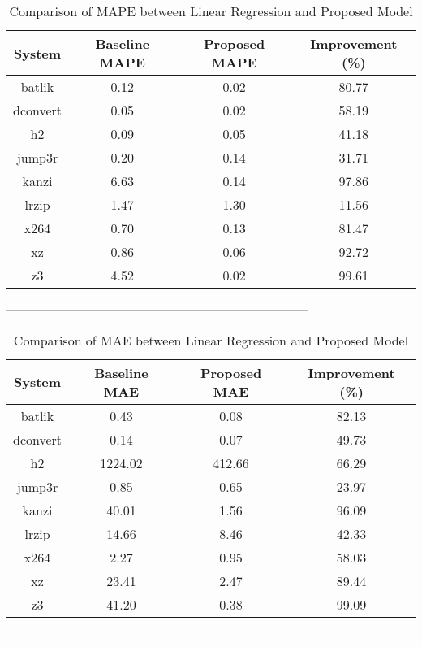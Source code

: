 \begin{table}[h]
    \centering
    \begin{tabular}{|c|c|c|c|}
        \hline
        System & Baseline MAPE & Proposed MAPE & Improvement (\%) \\
        \hline
        batlik & 0.12 & 0.02 & 80.77 \\
        dconvert & 0.05 & 0.02 & 58.19 \\
        h2 & 0.09 & 0.05 & 41.18 \\
        jump3r & 0.20 & 0.14 & 31.71 \\
        kanzi & 6.63 & 0.14 & 97.86 \\
        lrzip & 1.47 & 1.30 & 11.56 \\
        x264 & 0.70 & 0.13 & 81.47 \\
        xz & 0.86 & 0.06 & 92.72 \\
        z3 & 4.52 & 0.02 & 99.61 \\
        \hline
    \end{tabular}
    \caption{Comparison of MAPE between Linear Regression and Proposed Model}
    \label{tab:mape}
\end{table}
--------------------------------------------------------------------------------
\begin{table}[h]
    \centering
    \begin{tabular}{|c|c|c|c|}
        \hline
        System & Baseline MAE & Proposed MAE & Improvement (\%) \\
        \hline
        batlik & 0.43 & 0.08 & 82.13 \\
        dconvert & 0.14 & 0.07 & 49.73 \\
        h2 & 1224.02 & 412.66 & 66.29 \\
        jump3r & 0.85 & 0.65 & 23.97 \\
        kanzi & 40.01 & 1.56 & 96.09 \\
        lrzip & 14.66 & 8.46 & 42.33 \\
        x264 & 2.27 & 0.95 & 58.03 \\
        xz & 23.41 & 2.47 & 89.44 \\
        z3 & 41.20 & 0.38 & 99.09 \\
        \hline
    \end{tabular}
    \caption{Comparison of MAE between Linear Regression and Proposed Model}
    \label{tab:mae}
\end{table}
--------------------------------------------------------------------------------
